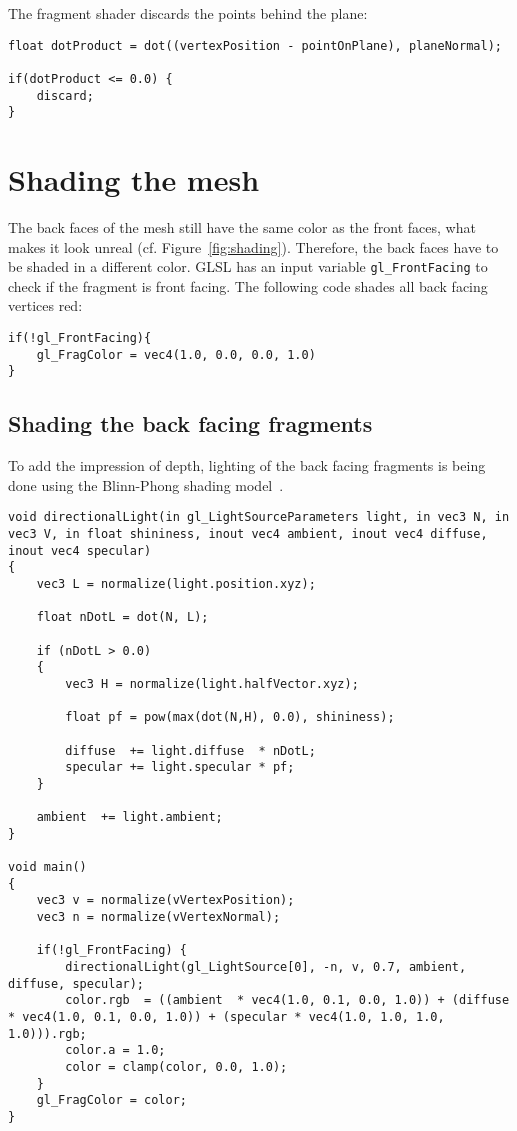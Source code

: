 The fragment shader discards the points behind the plane:
\begin{lstlisting}
float dotProduct = dot((vertexPosition - pointOnPlane), planeNormal);
		
if(dotProduct <= 0.0) {
	discard;
}
\end{lstlisting}

\section{Shading the mesh}
The back faces of the mesh still have the same color as the front faces, what makes it look unreal (cf. Figure~\ref{fig:shading}). Therefore, the back faces have to be shaded in a different color. GLSL has an input variable \texttt{gl\_FrontFacing} to check if the fragment is front facing. The following code shades all back facing vertices red:
\begin{lstlisting}
if(!gl_FrontFacing){
	gl_FragColor = vec4(1.0, 0.0, 0.0, 1.0)
}
\end{lstlisting}

\subsection{Shading the back facing fragments}
To add the impression of depth, lighting of the back facing fragments is being done using the Blinn-Phong shading model~\cite{book:computerGraphicsHearn}.
\begin{lstlisting}
void directionalLight(in gl_LightSourceParameters light, in vec3 N, in vec3 V, in float shininess, inout vec4 ambient, inout vec4 diffuse, inout vec4 specular)
{
	vec3 L = normalize(light.position.xyz);
	 
	float nDotL = dot(N, L);
	 
	if (nDotL > 0.0)
	{   
		vec3 H = normalize(light.halfVector.xyz);
			 
		float pf = pow(max(dot(N,H), 0.0), shininess);

		diffuse  += light.diffuse  * nDotL;
		specular += light.specular * pf;
	}
	 
	ambient  += light.ambient;
}

void main()
{
	vec3 v = normalize(vVertexPosition);
	vec3 n = normalize(vVertexNormal);
	
	if(!gl_FrontFacing) {
		directionalLight(gl_LightSource[0], -n, v, 0.7, ambient, diffuse, specular);
		color.rgb  = ((ambient  * vec4(1.0, 0.1, 0.0, 1.0)) + (diffuse  * vec4(1.0, 0.1, 0.0, 1.0)) + (specular * vec4(1.0, 1.0, 1.0, 1.0))).rgb;			
		color.a = 1.0;			
		color = clamp(color, 0.0, 1.0);
	}
	gl_FragColor = color;
}
\end{lstlisting}

